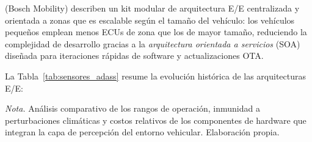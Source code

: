 \citet{Bosch_EE2024} (Bosch Mobility) describen un kit
modular de arquitectura E/E centralizada y orientada a zonas
que es escalable según el tamaño del vehículo: los vehículos
pequeños emplean menos ECUs de zona que los de mayor tamaño,
reduciendo la complejidad de desarrollo gracias a la
\textit{arquitectura orientada a servicios} (SOA) diseñada
para iteraciones rápidas de software y actualizaciones OTA.

La Tabla~\ref{tab:sensores_adass} resume la evolución
histórica de las arquitecturas E/E:

\begin{table}[h]
	\centering
	\captionsetup{labelformat=simple, labelsep=newline, textfont=it, labelfont=bf}
	\caption{Comparativa de sensores empleados en sistemas avanzados de asistencia al conductor y sus características operativas}
	\label{tab:sensores_adass}
	
	\renewcommand{\arraystretch}{1.3}
	
	\vspace{0.2cm}
	
	\begin{flushleft}
		\footnotesize \textit{Nota.} Análisis comparativo de los rangos de operación, inmunidad a perturbaciones climáticas y costos relativos de los componentes de hardware que integran la capa de percepción del entorno vehicular. Elaboración propia.
	\end{flushleft}
\end{table}

